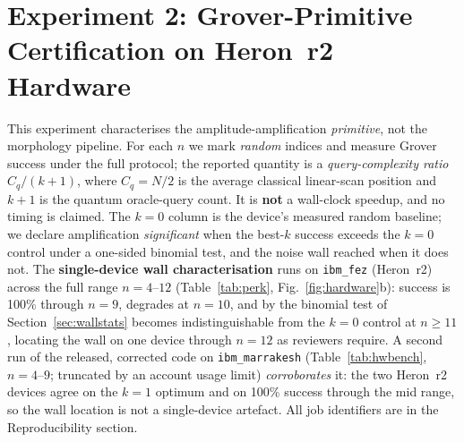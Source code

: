 \documentclass[journal]{IEEEtran}
\begin{document}
\section{Experiment 2: Grover-Primitive Certification on Heron~r2 Hardware}
\label{sec:hwbench}
This experiment characterises the amplitude-amplification \emph{primitive}, not
the morphology pipeline. For each $n$ we mark \emph{random} indices and measure
Grover success under the full protocol; the reported quantity is a
\emph{query-complexity ratio} $C_q/(k{+}1)$, where $C_q=N/2$ is the average
classical linear-scan position and $k{+}1$ is the quantum oracle-query count. It
is \textbf{not} a wall-clock speedup, and no timing is claimed. The $k{=}0$
column is the device's measured random baseline; we declare amplification
\emph{significant} when the best-$k$ success exceeds the $k{=}0$ control under a
one-sided binomial test, and the noise wall reached when it does not.
The \textbf{single-device wall characterisation} runs on \texttt{ibm\_fez}
(Heron~r2) across the full range $n{=}4$--$12$ (Table~\ref{tab:perk},
Fig.~\ref{fig:hardware}b): success is 100\% through $n{=}9$, degrades at $n{=}10$,
and by the binomial test of Section~\ref{sec:wallstats} becomes indistinguishable
from the $k{=}0$ control at $n\!\ge\!11$, locating the wall on one device through
$n{=}12$ as reviewers require. A second run of the released, corrected code on
\texttt{ibm\_marrakesh} (Table~\ref{tab:hwbench}, $n{=}4$--$9$; truncated by an
account usage limit) \emph{corroborates} it: the two Heron~r2 devices agree on the
$k{=}1$ optimum and on 100\% success through the mid range, so the wall location is
not a single-device artefact. All job identifiers are in the Reproducibility
section.
\end{document}
